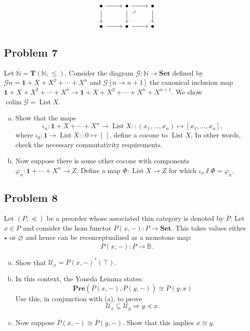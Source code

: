 \documentclass{amsart}
\theoremstyle{remark}
\theoremstyle{definition}
\theoremstyle{definition}
\DeclareMathOperator{\List}{List}
\DeclareMathOperator{\colim}{colim}
\newcommand{\ol}[1]{\overline{#1}}
\def\then{\sslash}
\def\Set{\mathbf{Set}}
\def\Pre{\mathbf{Pre}}
\def\BB{\mathbb B}
\def\NN{\mathbb N}
\begin{document}
\[
\begin{tikzcd}
\bullet \arrow[r] \arrow[d] & \bullet  \arrow[dr, phantom, "\lrcorner", very near start]  \arrow[r] \arrow[d] & \bullet \arrow[d] \\
\bullet \arrow[r] & \bullet  \arrow[r] & \bullet
\end{tikzcd}
\]

\subsection{Problem 7}

Let $\ol{\NN}=\mathbf{T}(\NN,\leq)$. Consider the diagram $\mathcal{G}:\ol{\NN}\to\Set$ defined by $\mathcal{G}n=\mathbf{1}+X+X^2+\cdots+X^n$ and $\mathcal{G}[n\to n+1]$ the canonical inclusion map $\mathbf{1}+X+X^2+\cdots+X^n\to \mathbf{1}+X+X^2+\cdots+X^n+X^{n+1}$. We show $\colim\mathcal{G}=\List X$.
\begin{enumerate}[(a)]
    \item Show that the maps \[\iota_n:\mathbf{1}+X+\cdots+X^n\to\List X::(x_1,\dots,x_n)\mapsto[x_1,\dots,x_n],\]
    where $\iota_0:\mathbf{1}\to\List X::0\mapsto [\:]$, define a cocone to $\List X$. In other words, check the necessary commutativity requirements.
    \item Now suppose there is some other cocone with components $\varphi_n:\mathbf{1}+\cdots+X^n\to Z$. Define a map $\Phi:\List X\to Z$ for which $\iota_n\then\Phi = \varphi_n$. 
\end{enumerate}


\subsection{Problem 8}

Let $(P,\preceq)$ be a preorder whose associated thin category is denoted by $\ol{P}$. Let $x\in P$ and consider the hom functor $\ol{P}(x,-):P\to\Set$. This takes values either $\star$ or $\varnothing$ and hence can be reconceptualized as a monotone map:
\[\ol{P}(x,-):P\to\BB.\]
\begin{enumerate}[(a)]
    \item Show that $\mathcal{U}_x=\ol{P}(x,-)^*(\top)$.
    \item In this context, the Yoneda Lemma states:
    \[\Pre(\ol{P}(x,-),\ol{P}(y,-))\cong\ol{P}(y,x)\]
    Use this, in conjunction with (a), to prove
    \[\mathcal{U}_x\subseteq\mathcal{U}_y \Rightarrow y\preceq x.\]
    \item Now suppose $\ol{P}(x,-)\cong\ol{P}(y,-)$. Show that this implies $x\cong y$.
\end{enumerate}
\end{document}
